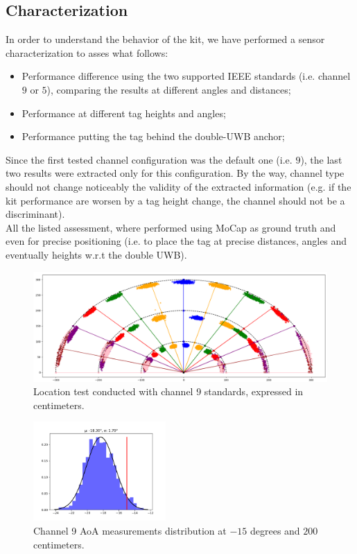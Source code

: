 \subsection{Characterization}
In order to understand the behavior of the kit, we have performed a sensor characterization to asses what follows:
\begin{itemize}
    \item Performance difference using the two supported IEEE standards (i.e. channel $9$ or $5$), comparing the results at different angles and distances;
    \item Performance at different tag heights and angles;
    \item Performance putting the tag behind the double-UWB anchor;
\end{itemize}
Since the first tested channel configuration was the default one (i.e. $9$), the last two results were extracted only for this configuration. By the way, channel type should not change noticeably the validity of the extracted information (e.g. if the kit performance are worsen by a tag height change, the channel should not be a discriminant).\\
All the listed assessment, where performed using MoCap as ground truth and even for precise positioning (i.e. to place the tag at precise distances, angles and eventually heights w.r.t the double UWB).\\

\begin{figure}
    \centering
    \includegraphics[width=1.0\textwidth]{images/characterization/ch9_characterization.png}
    \caption{Location test conducted with channel 9 standards, expressed in centimeters.}
    \label{UWB:fig:ch9test}
\end{figure}

\begin{figure}
    \centering
    \includegraphics[width=0.45\textwidth]{images/characterization/ch9_aoa_hist.png}
    \caption{Channel 9 AoA measurements distribution at $-15$ degrees and $200$ centimeters.}
    \label{UWB:fig:AoA_ch9}
\end{figure}

